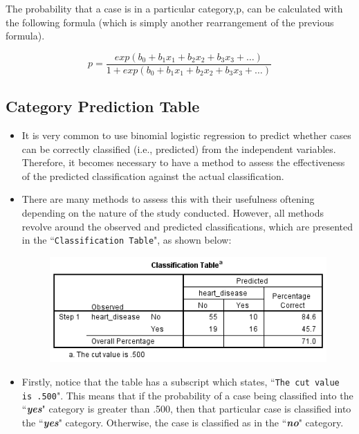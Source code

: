 \documentclass[a4paper,12pt]{article}
\begin{document}
The probability that a case is in a particular category,p, can be calculated with the following formula (which is simply another rearrangement of the previous formula).

\[p = \frac{exp(b_0 + b_1x_1 + b_2x_2 + b_3x_3 + \ldots)}{1 + exp(b_0 + b_1x_1 + b_2x_2 + b_3x_3 + \ldots)}\]

\newpage



\subsection{Category Prediction Table}

\begin{itemize}
	\item It is very common to use binomial logistic regression to predict whether cases can be correctly classified (i.e., predicted) from the independent variables. Therefore, it becomes necessary to have a method to assess the effectiveness of the predicted classification against the actual classification.
	\item  There are many methods to assess this with their usefulness oftening depending on the nature of the study conducted. However, all methods revolve around the observed and predicted classifications, which are presented in the ``\texttt{Classification Table}", as shown below:
	
	
	\begin{figure}
		\centering
		\includegraphics[width=0.8\linewidth]{images/BLogReg-Table}
	\end{figure}
	
	
	
	\item Firstly, notice that the table has a subscript which states, ``\texttt{The cut value is .500}". This means that if the probability of a case being classified into the ``\textbf{\textit{yes}}" category is greater than .500, then that particular case is classified into the ``\textbf{\textit{yes}}" category. 
	Otherwise, the case is classified as in the ``\textbf{\textit{no}}" category. 
\end{itemize}
\end{document}
